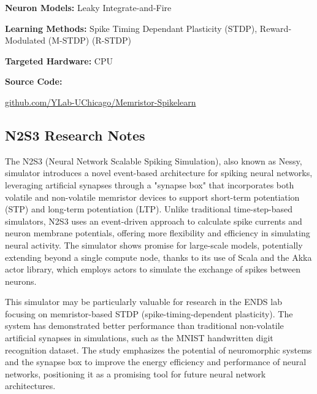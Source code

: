 \begin{tcolorbox}[enhanced,attach boxed title to top center={yshift=-3mm,yshifttext=-1mm}, colback=blue!5!white,colframe=blue!75!black,colbacktitle=red!80!black, title=Memristor-Spikelearn at a Glance,fonttitle=\bfseries, boxed title style={size=small,colframe=red!50!black} ]

\textbf{Neuron Models:} Leaky Integrate-and-Fire

\textbf{Learning Methods:} Spike Timing Dependant Plasticity (STDP), Reward-Modulated (M-STDP) (R-STDP)  

\textbf{Targeted Hardware:} CPU 

\textbf{Source Code:} 

\href{https://github.com/YLab-UChicago/Memristor-Spikelearn}{github.com/YLab-UChicago/Memristor-Spikelearn}
\end{tcolorbox}
\subsection*{N2S3 Research Notes}\label{N2S3}

The N2S3 (Neural Network Scalable Spiking Simulation), also known as Nessy, simulator introduces a novel event-based architecture for spiking neural networks, leveraging artificial synapses through a "synapse box" that incorporates both volatile and non-volatile memristor devices to support short-term potentiation (STP) and long-term potentiation (LTP). Unlike traditional time-step-based simulators, N2S3 uses an event-driven approach to calculate spike currents and neuron membrane potentials, offering more flexibility and efficiency in simulating neural activity. The simulator shows promise for large-scale models, potentially extending beyond a single compute node, thanks to its use of Scala and the Akka actor library, which employs actors to simulate the exchange of spikes between neurons.

This simulator may be particularly valuable for research in the ENDS lab focusing on memristor-based STDP (spike-timing-dependent plasticity). The system has demonstrated better performance than traditional non-volatile artificial synapses in simulations, such as the MNIST handwritten digit recognition dataset. The study emphasizes the potential of neuromorphic systems and the synapse box to improve the energy efficiency and performance of neural networks, positioning it as a promising tool for future neural network architectures.


